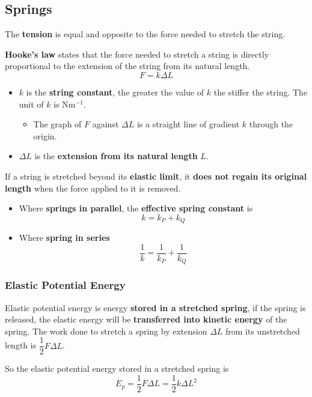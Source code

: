 \subsection{Springs}

The \textbf{tension} is equal and opposite to the force needed to stretch the string.

\textbf{Hooke's law} states that the force needed to stretch a string is directly proportional to the extension of the string from its natural length.
$$F=k\Delta L$$
\begin{itemize}
    \item $k$ is the \textbf{string constant}, the greater the value of $k$ the stiffer the string. The unit of $k$ is Nm$^{-1}$.
        \begin{itemize}
            \item The graph of $F$ against $\Delta L$ is a straight line of gradient $k$ through the origin.
        \end{itemize}
    \item $\Delta L$ is the \textbf{extension from its natural length} $L$.
\end{itemize}

If a string is stretched beyond its \textbf{elastic limit}, it \textbf{does not regain its original length} when the force applied to it is removed.

\begin{itemize}
    \item Where \textbf{springs in parallel}, the \textbf{effective spring constant} is
        $$k=k_P+k_Q$$
    \item Where \textbf{spring in series}
        $$\frac{1}{k}=\frac{1}{k_P}+\frac{1}{k_Q}$$
\end{itemize}

\subsubsection*{Elastic Potential Energy}

Elastic potential energy is energy \textbf{stored in a stretched spring}, if the spring is released, the elastic energy will be \textbf{transferred into kinetic energy} of the spring. The work done to stretch a spring by extension $\Delta L$ from its unstretched length is $\dfrac{1}{2}F\Delta L$.

So the elastic potential energy stored in a stretched spring is
$$E_p=\frac{1}{2}F\Delta L=\frac{1}{2}k\Delta L^2$$
